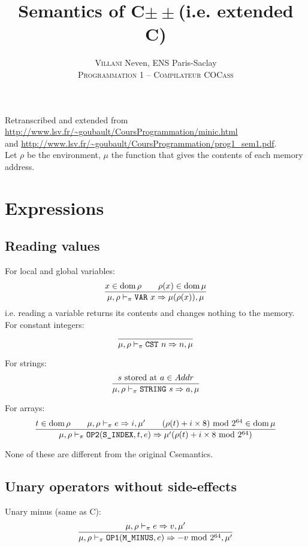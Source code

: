 

\newcommand{\Cpm}{C\(\pm\pm\)}
\newcommand{\Cmm}{C\textminus\textminus}

\title{Semantics of \Cpm (i.e. extended \Cmm)}
\author{\textsc{Villani} Neven, ENS Paris-Saclay\\\textsc{Programmation 1 -- Compilateur COCass}}


\maketitle

Retranscribed and extended from \url{http://www.lsv.fr/~goubault/CoursProgrammation/minic.html}\\
and \url{http://www.lsv.fr/~goubault/CoursProgrammation/prog1_sem1.pdf}.\\

Let \(\rho\) be the environment, \(\mu\) the function that gives the contents of each memory address.\\

\section{Expressions}
\subsection{Reading values}

For local and global variables:
\[\dfrac{x\in\operatorname{dom}\rho \qquad \rho(x)\in\operatorname{dom}\mu}{\mu,\rho\vdash_\pi \texttt{VAR}\ x\Rightarrow \mu(\rho(x)), \mu}\]
i.e. reading a variable returns its contents and changes nothing to the memory.\\

For constant integers:
\[\dfrac{}{\mu,\rho\vdash_\pi \texttt{CST}\ n\Rightarrow n, \mu}\]

For strings:
\[\dfrac{s\text{ stored at }a\in Addr}{\mu,\rho\vdash_\pi \texttt{STRING}\ s\Rightarrow a, \mu}\]

For arrays:
\[\dfrac{t\in\operatorname{dom}\rho \qquad \mu,\rho\vdash_\pi e\Rightarrow i,\mu' \qquad (\rho(t)+i\times 8)\text{ mod } 2^{64}\in\operatorname{dom}\mu}{\mu,\rho\vdash_\pi \texttt{OP2}(\texttt{S\_INDEX}, t, e) \Rightarrow \mu'(\rho(t)+i\times 8 \text{ mod } 2^{64})}\]

None of these are different from the original \Cmm semantics.

\subsection{Unary operators without side-effects}
Unary minus (same as \Cmm):
\[\dfrac{\mu,\rho\vdash_\pi e \Rightarrow v,\mu'}{\mu,\rho\vdash_\pi \texttt{OP1}(\texttt{M\_MINUS}, e) \Rightarrow -v \text{ mod } 2^{64},\mu'}\]

